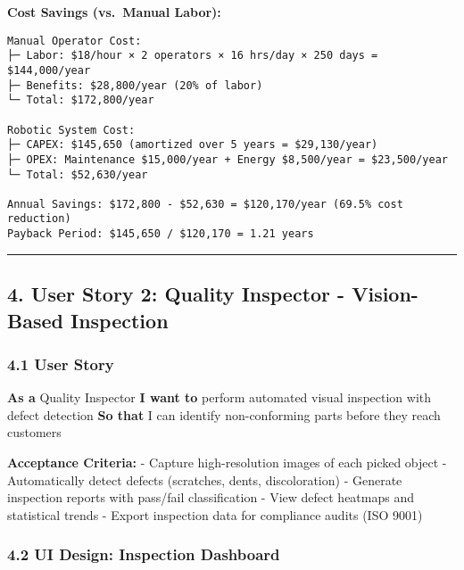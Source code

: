 \documentclass[
]{article}
\begin{document}
\textbf{Cost Savings (vs.~Manual Labor):}

\begin{verbatim}
Manual Operator Cost:
├─ Labor: $18/hour × 2 operators × 16 hrs/day × 250 days = $144,000/year
├─ Benefits: $28,800/year (20% of labor)
└─ Total: $172,800/year

Robotic System Cost:
├─ CAPEX: $145,650 (amortized over 5 years = $29,130/year)
├─ OPEX: Maintenance $15,000/year + Energy $8,500/year = $23,500/year
└─ Total: $52,630/year

Annual Savings: $172,800 - $52,630 = $120,170/year (69.5% cost reduction)
Payback Period: $145,650 / $120,170 = 1.21 years
\end{verbatim}

\begin{center}\rule{0.5\linewidth}{0.5pt}\end{center}

\hypertarget{user-story-2-quality-inspector---vision-based-inspection}{%
\subsection{4. User Story 2: Quality Inspector - Vision-Based
Inspection}\label{user-story-2-quality-inspector---vision-based-inspection}}

\hypertarget{user-story-1}{%
\subsubsection{4.1 User Story}\label{user-story-1}}

\textbf{As a} Quality Inspector \textbf{I want to} perform automated
visual inspection with defect detection \textbf{So that} I can identify
non-conforming parts before they reach customers

\textbf{Acceptance Criteria:} - Capture high-resolution images of each
picked object - Automatically detect defects (scratches, dents,
discoloration) - Generate inspection reports with pass/fail
classification - View defect heatmaps and statistical trends - Export
inspection data for compliance audits (ISO 9001)

\hypertarget{ui-design-inspection-dashboard}{%
\subsubsection{4.2 UI Design: Inspection
Dashboard}\label{ui-design-inspection-dashboard}}
\end{document}
